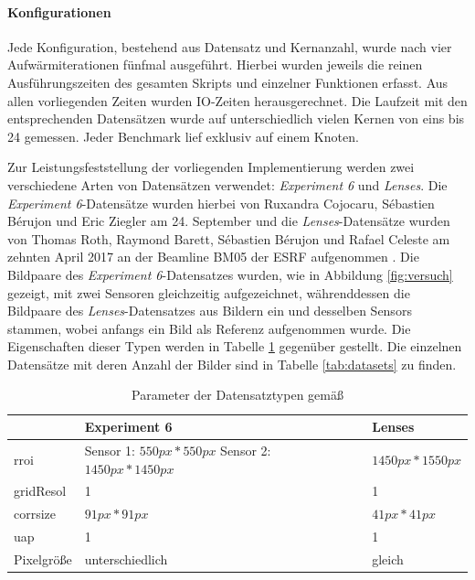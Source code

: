 \paragraph{Konfigurationen}

Jede Konfiguration, bestehend aus Datensatz und Kernanzahl, wurde nach vier Aufwärmiterationen fünfmal ausgeführt. Hierbei wurden jeweils die reinen Ausführungszeiten des gesamten Skripts und einzelner Funktionen erfasst. Aus allen vorliegenden Zeiten wurden \gls{IO}-Zeiten herausgerechnet. Die Laufzeit mit den entsprechenden Datensätzen wurde auf unterschiedlich vielen Kernen von eins bis 24 gemessen. Jeder Benchmark lief exklusiv auf einem Knoten. 

Zur Leistungsfeststellung der vorliegenden Implementierung werden zwei verschiedene Arten von Datensätzen verwendet: \textit{Experiment 6} und \textit{Lenses}. Die \textit{Experiment 6}-Datensätze wurden hierbei von Ruxandra Cojocaru, Sébastien Bérujon und Eric Ziegler am 24. September und die \textit{Lenses}-Datensätze wurden von Thomas Roth, Raymond Barett, Sébastien Bérujon und Rafael Celeste am zehnten April 2017 an der Beamline BM05 der \gls{ESRF} aufgenommen \cite{CBZ17, RBB+17}. Die Bildpaare des \textit{Experiment 6}-Datensatzes wurden, wie in Abbildung \ref{fig:versuch} gezeigt, mit zwei Sensoren gleichzeitig aufgezeichnet, währenddessen die Bildpaare des \textit{Lenses}-Datensatzes aus Bildern ein und desselben Sensors stammen, wobei anfangs ein Bild als Referenz aufgenommen wurde. Die Eigenschaften dieser Typen werden in Tabelle \ref{tab:dataset_types} gegenüber gestellt. Die einzelnen Datensätze mit deren Anzahl der Bilder sind in Tabelle \ref{tab:datasets} zu finden. 

\begin{table}
	\begin{tabularx}{\textwidth}{@{} XXX @{}}
		\toprule
		& Experiment 6 & Lenses \\
		\hline
		\gls{rroi} & Sensor 1: $550px * 550px$ \newline
		Sensor 2: $1450px * 1450px$  & $1450px * 1550px$ \\
		\gls{gridResol} & 1 & 1 \\
		\gls{corrsize} & $91px * 91px$ & $41px * 41px$ \\
		\gls{uap} & 1 & 1 \\
		Pixelgröße & unterschiedlich & gleich \\
		\bottomrule
	\end{tabularx}
	\caption{Parameter der Datensatztypen gemäß \citeauthor{Coj17} \cite{Coj17}}
	\label{tab:dataset_types}
\end{table}

